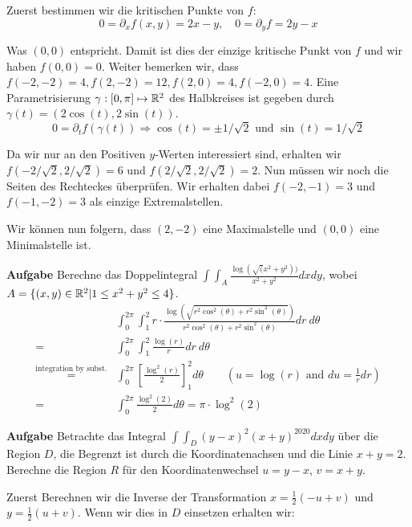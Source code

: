 Zuerst bestimmen wir die kritischen Punkte von $f$:
$$0 = \partial_x f(x,y) = 2x - y, \quad 0 = \partial_y f = 2y - x$$

Was $(0,0)$ entspricht. Damit ist dies der einzige kritische Punkt von $f$ und
wir haben $f(0,0) = 0$. Weiter bemerken wir, dass $f(-2, -2) = 4, f(2, -2) = 12, 
f(2, 0) = 4, f(-2, 0) = 4$. Eine Parametrisierung $\gamma: [0, \pi] \mapsto \mathbb{R}^2$
des Halbkreises ist gegeben durch $\gamma(t) = (2\cos(t), 2\sin(t))$.
$$0 = \partial_t f(\gamma(t)) \Rightarrow \cos(t) = \pm 1 / \sqrt{2} \text{ und } \sin(t) = 1 / \sqrt{2}$$

Da wir nur an den Positiven $y$-Werten interessiert sind, erhalten wir 
$f(-2/\sqrt{2}, 2 / \sqrt{2}) = 6$ und $f(2 / \sqrt{2}, 2 / \sqrt{2}) = 2$.
Nun müssen wir noch die Seiten des Rechteckes überprüfen. Wir erhalten dabei
$f(-2, -1) = 3$ und $f(-1, -2) = 3$ als einzige Extremalstellen. \smallskip

Wir können nun folgern, dass $(2, -2)$ eine Maximalstelle und $(0,0)$ eine
Minimalstelle ist.

\hrulefill

\textbf{Aufgabe} Berechne das Doppelintegral $\int \int_A \frac{\log(\sqrt(x^2 + y^2))}{x^2 +
y^2}dxdy$, wobei $A = \{(x,y) \in \mathbb{R}^2 | 1 \leq x^2 + y^2 \leq 4\}$.
\begin{align*}
    &\int_{0}^{2 \pi} \int_{1}^{2} r \cdot \frac{\log \left(\sqrt{r^2 \cos^2 (\theta) + r^2 \sin^2 (\theta)}\right)}{r^2 \cos^2 (\theta) + r^2 \sin^2 (\theta)} dr \ d\theta \\
    = &\int_{0}^{2 \pi} \int_{1}^{2} \frac{\log (r)}{r} dr \ d\theta \\
    \stackrel{\text{integration by subst.}}{=} &\int_{0}^{2 \pi} \left[ \frac{\log^2 (r)}{2} \right]_1^2 d\theta \qquad \left(u = \log (r) \text{ and } du = \frac{1}{r} dr \right)\\
    = &\int_{0}^{2 \pi} \frac{\log^2 (2)}{2} d\theta = \pi \cdot \log^2 (2)
\end{align*}

\hrulefill

\textbf{Aufgabe} Betrachte das Integral $\int \int_D (y-x)^2(x+y)^{2020}dxdy$ über die
Region $D$, die Begrenzt ist durch die Koordinatenachsen und die Linie $x + y = 2$.
Berechne die Region $R$ für den Koordinatenwechsel $u = y - x$, $v = x + y$. \smallskip

Zuerst Berechnen wir die Inverse der Transformation $x = \frac{1}{2}(-u+v)$ und 
$y = \frac{1}{2}(u + v)$. Wenn wir dies in $D$ einsetzen erhalten wir:

